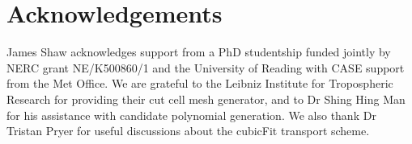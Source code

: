 \documentclass[times]{elsarticle}
\begin{document}






\section{Acknowledgements}
James Shaw acknowledges support from a PhD studentship funded jointly by NERC grant NE/K500860/1 and the University of Reading with CASE support from the Met Office.
We are grateful to the Leibniz Institute for Tropospheric Research for providing their cut cell mesh generator, and to Dr Shing Hing Man for his assistance with candidate polynomial generation.  We also thank Dr Tristan Pryer for useful discussions about the cubicFit transport scheme.






\end{document}
